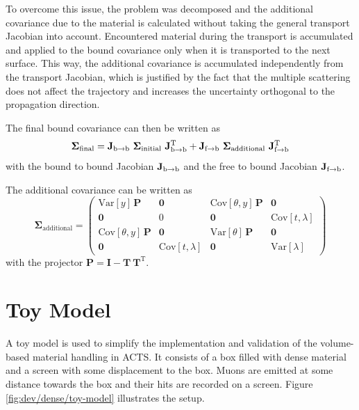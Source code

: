 To overcome this issue, the problem was decomposed and the additional covariance due to the material is calculated without taking the general transport Jacobian into account. Encountered material during the transport is accumulated and applied to the bound covariance only when it is transported to the next surface. This way, the additional covariance is accumulated independently from the transport Jacobian, which is justified by the fact that the multiple scattering does not affect the trajectory and increases the uncertainty orthogonal to the propagation direction.

The final bound covariance can then be written as
\begin{equation}
    \mathbf{\Sigma}_\text{final} = \mathbf{J}_{\text{b\textrightarrow b}} \ \mathbf{\Sigma}_\text{initial} \ \mathbf{J}_{\text{b\textrightarrow b}}^\mathrm{T} + \mathbf{J}_{\text{f\textrightarrow b}} \ \mathbf{\Sigma}_\text{additional} \ \mathbf{J}_{\text{f\textrightarrow b}}^\mathrm{T}
\end{equation}
with the bound to bound Jacobian $\mathbf{J}_{\text{b\textrightarrow b}}$ and the free to bound Jacobian $\mathbf{J}_{\text{f\textrightarrow b}}$.

The additional covariance can be written as
\begin{equation}
    \mathbf{\Sigma}_\text{additional} =
        \begin{pmatrix}
            \text{Var}[y] \, \mathbf{P} & \mathbf{0} & \text{Cov}[\theta,y] \, \mathbf{P} & \mathbf{0} \\
            \mathbf{0} & 0 & \mathbf{0} & \text{Cov}[t,\lambda] \\
            \text{Cov}[\theta,y] \, \mathbf{P} & \mathbf{0} & \text{Var}[\theta] \, \mathbf{P} & \mathbf{0} \\
            \mathbf{0} & \text{Cov}[t,\lambda] & \mathbf{0} & \text{Var}[\lambda]
        \end{pmatrix}
\end{equation}
with the projector $\mathbf{P} = \mathbf{I} - \mathbf{T} \ \mathbf{T}^\mathrm{T}$.

\section{Toy Model}

A toy model is used to simplify the implementation and validation of the volume-based material handling in ACTS. It consists of a box filled with dense material and a screen with some displacement to the box. Muons are emitted at some distance towards the box and their hits are recorded on a screen. Figure \ref{fig:dev/dense/toy-model} illustrates the setup.

